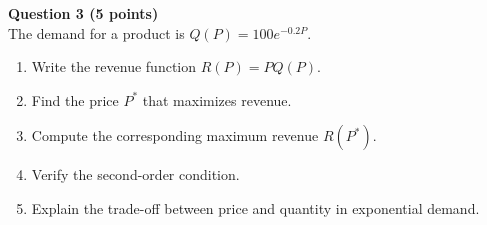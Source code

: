 \documentclass[12pt]{article}
\begin{document}
\vspace{1em}

\textbf{Question 3 (5 points)}\\
The demand for a product is \( Q(P) = 100e^{-0.2P} \).

\begin{enumerate}
\item Write the revenue function \( R(P) = PQ(P) \).  
\item Find the price \(P^*\) that maximizes revenue.  
\item Compute the corresponding maximum revenue \(R(P^*)\).  
\item Verify the second-order condition.  
\item Explain the trade-off between price and quantity in exponential demand.
\end{enumerate}
\end{document}
